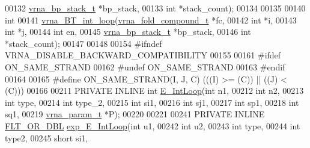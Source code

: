 \begin{DoxyCode}
00132               \hyperlink{group__data__structures_structvrna__bp__stack__s}{vrna\_bp\_stack\_t}       *bp\_stack,
00133               \textcolor{keywordtype}{int}                   *stack\_count);
00134 
00135 
00140 \textcolor{keywordtype}{int}
00141 \hyperlink{group__mfe__backtracking_ga90b5a5723173996fb40640ce7c95c07e}{vrna\_BT\_int\_loop}(\hyperlink{group__fold__compound_structvrna__fc__s}{vrna\_fold\_compound\_t} *fc,
00142                  \textcolor{keywordtype}{int}                  *i,
00143                  \textcolor{keywordtype}{int}                  *j,
00144                  \textcolor{keywordtype}{int}                  en,
00145                  \hyperlink{group__data__structures_structvrna__bp__stack__s}{vrna\_bp\_stack\_t}      *bp\_stack,
00146                  \textcolor{keywordtype}{int}                  *stack\_count);
00147 
00148 
00154 \textcolor{preprocessor}{#ifndef VRNA\_DISABLE\_BACKWARD\_COMPATIBILITY}
00155 
00161 \textcolor{preprocessor}{#ifdef ON\_SAME\_STRAND}
00162 \textcolor{preprocessor}{#undef ON\_SAME\_STRAND}
00163 \textcolor{preprocessor}{#endif}
00164 
00165 \textcolor{preprocessor}{#define ON\_SAME\_STRAND(I, J, C)  (((I) >= (C)) || ((J) < (C)))}
00166 
00211 PRIVATE INLINE \textcolor{keywordtype}{int} \hyperlink{group__eval__deprecated_gaafbc187b7f78e8e82afb77dd6f3b8fc5}{E\_IntLoop}(\textcolor{keywordtype}{int}          n1,
00212                              \textcolor{keywordtype}{int}          n2,
00213                              \textcolor{keywordtype}{int}          type,
00214                              \textcolor{keywordtype}{int}          type\_2,
00215                              \textcolor{keywordtype}{int}          si1,
00216                              \textcolor{keywordtype}{int}          sj1,
00217                              \textcolor{keywordtype}{int}          sp1,
00218                              \textcolor{keywordtype}{int}          sq1,
00219                              \hyperlink{group__energy__parameters_structvrna__param__s}{vrna\_param\_t} *P);
00220 
00221 
00241 PRIVATE INLINE \hyperlink{group__data__structures_ga31125aeace516926bf7f251f759b6126}{FLT\_OR\_DBL} \hyperlink{group__eval__deprecated_ga95de54d8a2a17645a95e0f34e189d9c9}{exp\_E\_IntLoop}(\textcolor{keywordtype}{int}               u1,
00242                                         \textcolor{keywordtype}{int}               u2,
00243                                         \textcolor{keywordtype}{int}               type,
00244                                         \textcolor{keywordtype}{int}               type2,
00245                                         \textcolor{keywordtype}{short}             si1,

\end{DoxyCode}
